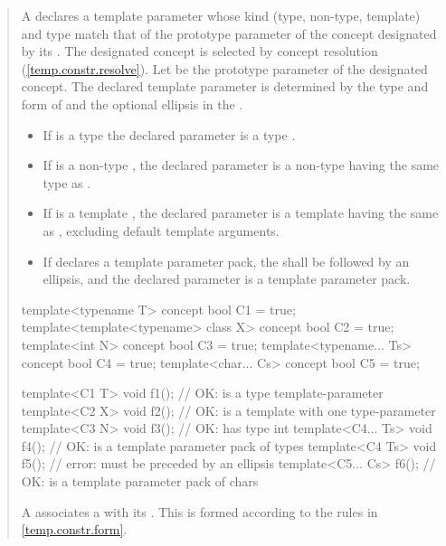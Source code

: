 \begin{quote}
\setcounter{Paras}{8}
\pnum
A  declares a template parameter whose 
kind (type, non-type, template) and type match that of the prototype parameter 
of the concept designated by its .
% 
The designated concept is selected by concept resolution 
(\ref{temp.constr.resolve}).
% 
Let  be the prototype parameter of the designated
concept. The declared template parameter is determined by the type
and form of  and the optional ellipsis in the
.
% 
\begin{itemize}
\item If  is a type  the declared
parameter is a type . 

\item If  is a non-type , the declared
parameter is a non-type  having the same 
type as .

\item If  is a template , the declared
parameter is a template  having the same 
 as , excluding default template 
arguments.

\item If  declares a template parameter pack, the 
 shall be followed by an ellipsis,
and the declared parameter is a template parameter pack. 
\end{itemize}
% 
\enterexample
\begin{codeblock}
template<typename T> concept bool C1 = true;
template<template<typename> class X> concept bool C2 = true;
template<int N> concept bool C3 = true;
template<typename... Ts> concept bool C4 = true;
template<char... Cs> concept bool C5 = true;

template<C1 T> void f1();     // OK:  is a type template-parameter
template<C2 X> void f2();     // OK:  is a template with one type-parameter
template<C3 N> void f3();     // OK:  has type int
template<C4... Ts> void f4(); // OK:  is a template parameter pack of types
template<C4 Ts> void f5();    // error:  must be preceded by an ellipsis
template<C5... Cs> f6();      // OK:  is a template parameter pack of chars
\end{codeblock}
\exitexample

\pnum
A  associates a
 with its
. 
% 
This  is formed according to the rules 
in \ref{temp.constr.form}.
\end{quote}

